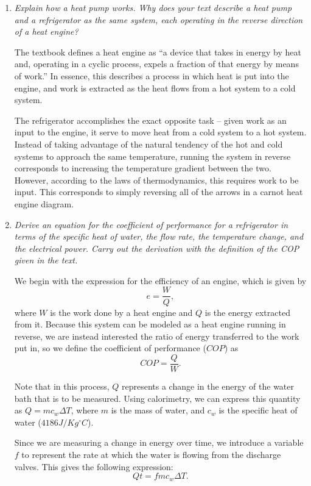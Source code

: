 \documentclass[twocolumn,english]{IEEEtran}
\theoremstyle{plain}
\theoremstyle{plain}
\begin{document}
\begin{enumerate}
	\item \textit{Explain how a heat pump works. Why does your text describe a heat pump and a refrigerator as the same system, each operating in the reverse direction of a heat engine?}

	The textbook defines a heat engine as ``a device that takes in energy by heat and, operating in a cyclic process, expels a fraction of that energy by means of work.'' In essence, this describes a process in which heat is put into the engine, and work is extracted as the heat flows from a hot system to a cold system.

	The refrigerator accomplishes the exact opposite task -- given work as an input to the engine, it serve to move heat from a cold system to a hot system. Instead of taking advantage of the natural tendency of the hot and cold systems to approach the same temperature, running the system in reverse corresponds to increasing the temperature gradient between the two. However, according to the laws of thermodynamics, this requires work to be input. This corresponds to simply reversing all of the arrows in a carnot heat engine diagram.

	\item \textit{Derive an equation for the coefficient of performance for a refrigerator in terms of the specific heat of water, the flow rate, the temperature change, and the electrical power. Carry out the derivation with the definition of the COP given in the text.}

	We begin with the expression for the efficiency of an engine, which is given by
	\begin{equation}
		e = \frac{W}{Q},
	\end{equation}
	where $W$ is the work done by a heat engine and $Q$ is the energy extracted from it. Because this system can be modeled as a heat engine running in reverse, we are instead interested the ratio of energy transferred to the work put in, so we define the coefficient of performance ($COP$) as
	\begin{equation}
		COP = \frac{Q}{W}.
	\end{equation}

	Note that in this process, $Q$ represents a change in the energy of the water bath that is to be measured. Using calorimetry, we can express this quantity as $Q = mc_w \Delta T$, where $m$ is the mass of water, and $c_w$ is the specific heat of water ($4186 J/Kg^{\circ}C$).

	Since we are measuring a change in energy over time, we introduce a variable $f$ to represent the rate at which the water is flowing from the discharge valves. This gives the following expression:
	\begin{equation}
		Qt = fmc_w\Delta T.
	\end{equation}



\end{enumerate}
\end{document}

